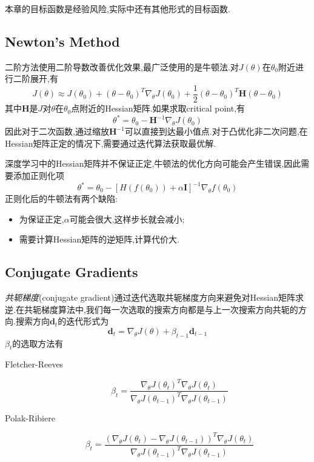本章的目标函数是经验风险,实际中还有其他形式的目标函数.

\subsection{Newton's Method}

二阶方法使用二阶导数改善优化效果,最广泛使用的是牛顿法.对$J(\theta)$在$\theta_0$附近进行二阶展开,有
\begin{equation}
J(\theta)\approx J(\theta_0)+(\theta-\theta_0)^T\nabla_\theta J(\theta_0)+\frac{1}{2}(\theta-\theta_0)^T\mathbf H(\theta-\theta_0)
\end{equation}
其中$\mathbf H$是$J$对$\theta$在$\theta_0$点附近的Hessian矩阵.如果求取critical point,有
\begin{equation}\label{eq:newtown_cirtical_point}
\theta^\ast=\theta_0-\mathbf H^{-1}\nabla_\theta J(\theta_0)
\end{equation}
因此对于二次函数,通过缩放$\mathbf H^{-1}$可以直接到达最小值点.对于凸优化非二次问题,在Hessian矩阵正定的情况下,需要通过迭代算法获取最优解.

深度学习中的Hessian矩阵并不保证正定,牛顿法的优化方向可能会产生错误,因此需要添加正则化项
\begin{equation}
\theta^\ast=\theta_0-\left[H(f(\theta_0))+\alpha\mathbf I\right]^{-1}\nabla_\theta f(\theta_0)
\end{equation}
正则化后的牛顿法有两个缺陷:
\begin{itemize}
    \item 为保证正定,$\alpha$可能会很大,这样步长就会减小;
    \item 需要计算Hessian矩阵的逆矩阵,计算代价大.
\end{itemize}

\subsection{Conjugate Gradients}

\textit{共轭梯度}(conjugate gradient)通过迭代选取共轭梯度方向来避免对Hessian矩阵求逆.在共轭梯度算法中,我们每一次选取的搜索方向都是与上一次搜索方向共轭的方向.搜索方向$\mathbf d_t$的迭代形式为
\begin{equation}
\mathbf d_t=\nabla_\theta J(\theta)+\beta_{t-1}\mathbf d_{t-1}
\end{equation}
$\beta_{t}$的选取方法有
\begin{description}
    \item [Fletcher-Reeves] \begin{equation}\beta_t=\frac{\nabla_\theta J(\theta_t)^T\nabla_\theta J(\theta_t)}{\nabla_\theta J(\theta_{t-1})^T\nabla_\theta J(\theta_{t-1})}\end{equation}
    \item [Polak-Ribiere] \begin{equation}\beta_t=\frac{(\nabla_\theta J(\theta_t)-\nabla_\theta J(\theta_{t-1}))^T\nabla_\theta J(\theta_t)}{\nabla_\theta J(\theta_{t-1})^T\nabla_\theta J(\theta_{t-1})}\end{equation}
\end{description}


